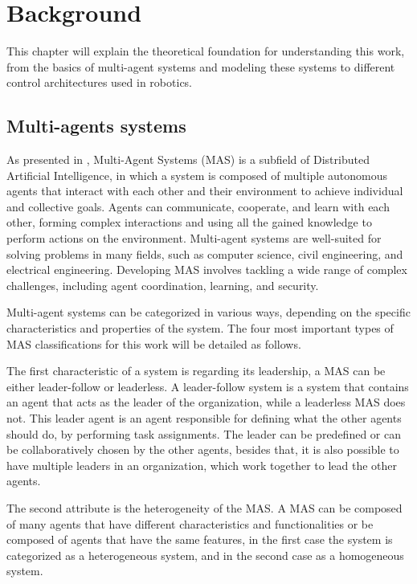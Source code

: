 \def \MOISEp {$\mathcal{M}OISE^+$ }
\def \MOISEpBf {$\mathbf{\mathcal{M}OISE^+}$ }

\chapter{Background}
\label{ch:background}

This chapter will explain the theoretical foundation for understanding this work, from the basics of multi-agent systems and modeling these systems to different control architectures used in robotics.

\section{Multi-agents systems}

As presented in \cite{MASSurvey}, Multi-Agent Systems (MAS) is a subfield of Distributed Artificial Intelligence, in which a system is composed of multiple autonomous agents that interact with each other and their environment to achieve individual and collective goals. Agents can communicate, cooperate, and learn with each other, forming complex interactions and using all the gained knowledge to perform actions on the environment. Multi-agent systems are well-suited for solving problems in many fields, such as computer science, civil engineering, and electrical engineering. Developing MAS involves tackling a wide range of complex challenges, including agent coordination, learning, and security.

Multi-agent systems can be categorized in various ways, depending on the specific characteristics and properties of the system. The four most important types of MAS classifications for this work will be detailed as follows.

The first characteristic of a system is regarding its leadership, a MAS can be either leader-follow or leaderless. A leader-follow system is a system that contains an agent that acts as the leader of the organization, while a leaderless MAS does not. This leader agent is an agent responsible for defining what the other agents should do, by performing task assignments. The leader can be predefined or can be collaboratively chosen by the other agents, besides that, it is also possible to have multiple leaders in an organization, which work together to lead the other agents.

The second attribute is the heterogeneity of the MAS. A MAS can be composed of many agents that have different characteristics and functionalities or be composed of agents that have the same features, in the first case the system is categorized as a heterogeneous system, and in the second case as a homogeneous system.

